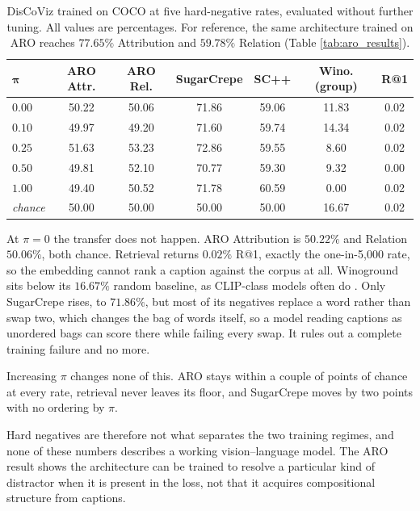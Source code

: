 \documentclass[12pt, a4paper, oneside]{report}
\begin{document}
\begin{table}[hbt!]
    \centering
    \begin{tabular}{l c c c c c c}
        \toprule
        $\boldsymbol{\pi}$ & \textbf{ARO Attr.} & \textbf{ARO Rel.} & \textbf{SugarCrepe} & \textbf{SC++} & \textbf{Wino. (group)} & \textbf{R@1} \\
        \midrule
        $0.00$ & 50.22 & 50.06 & 71.86 & 59.06 & 11.83 & 0.02 \\
        $0.10$ & 49.97 & 49.20 & 71.60 & 59.74 & 14.34 & 0.02 \\
        $0.25$ & 51.63 & 53.23 & 72.86 & 59.55 & 8.60 & 0.02 \\
        $0.50$ & 49.81 & 52.10 & 70.77 & 59.30 & 9.32 & 0.00 \\
        $1.00$ & 49.40 & 50.52 & 71.78 & 60.59 & 0.00 & 0.02 \\
        \midrule
        \textit{chance} & 50.00 & 50.00 & 50.00 & 50.00 & 16.67 & 0.02 \\
        \bottomrule
    \end{tabular}
    \caption{DisCoViz trained on COCO at five hard-negative rates, evaluated without further tuning. All values are percentages. For reference, the same architecture trained on ARO reaches $77.65\%$ Attribution and $59.78\%$ Relation (Table \ref{tab:aro_results}).}
    \label{tab:pi_sweep}
\end{table}

At $\pi = 0$ the transfer does not happen. ARO Attribution is $50.22\%$ and Relation $50.06\%$, both chance. Retrieval returns $0.02\%$ R@1, exactly the one-in-5,000 rate, so the embedding cannot rank a caption against the corpus at all. Winoground sits below its $16.67\%$ random baseline, as CLIP-class models often do \cite{thrush2022winoground}. Only SugarCrepe rises, to $71.86\%$, but most of its negatives replace a word rather than swap two, which changes the bag of words itself, so a model reading captions as unordered bags can score there while failing every swap. It rules out a complete training failure and no more.

Increasing $\pi$ changes none of this. ARO stays within a couple of points of chance at every rate, retrieval never leaves its floor, and SugarCrepe moves by two points with no ordering by $\pi$.

Hard negatives are therefore not what separates the two training regimes, and none of these numbers describes a working vision--language model. The ARO result shows the architecture can be trained to resolve a particular kind of distractor when it is present in the loss, not that it acquires compositional structure from captions.
\end{document}
